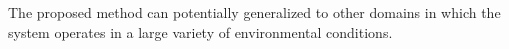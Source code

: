 %
%
%
The proposed method can potentially generalized to other domains in which the system operates in a large variety of environmental conditions.
%

